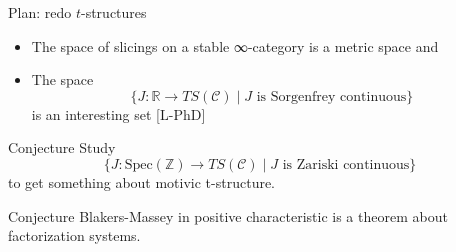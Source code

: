 \documentclass{beamer}
\begin{document}
%
%
%
%
%
\begin{frame}{Plan: redo $t$-structures}\small %

   \begin{itemize}
     \item<+-> The space of \alert{slicings} on a stable ∞-category is a metric space and
     
     \item<+-> The space \[\{ J \colon \mathbb R \to TS(\mathcal C) \mid J \text{ is Sorgenfrey continuous} \}\] 
     is an interesting set [\alert{L-PhD}]
    \end{itemize}

    \onslide<+->
    \begin{block}{Conjecture}
  Study
\[\{ J \colon \text{Spec}(\mathbb Z) \to TS(\mathcal C) \mid J \text{ is Zariski continuous} \}\]
to get something about motivic t-structure.
 \end{block}
 \onslide<+->
 \begin{block}{Conjecture}
 Blakers-Massey in positive characteristic is a theorem about factorization systems.
 \end{block}
\end{frame}
%
%
%
%
\end{document}
